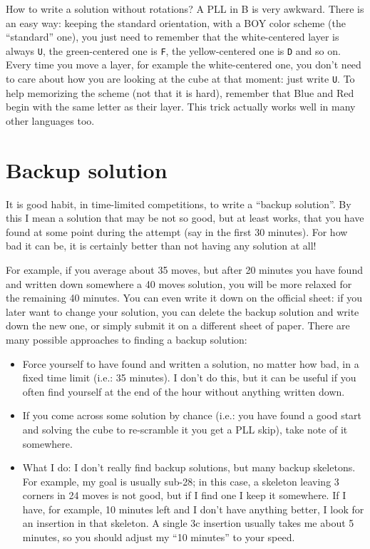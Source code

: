 \documentclass[11pt,a4paper]{book}
\newcommand{\m}{\texttt}
\begin{document}
How to write a solution without rotations? A PLL in B is very awkward. There is an easy way: keeping the standard orientation, with a BOY color scheme (the ``standard'' one), you just need to remember that the white-centered layer is always \m U, the green-centered one is \m F, the yellow-centered one is \m D and so on. Every time you move a layer, for example the white-centered one, you don't need to care about how you are looking at the cube at that moment: just write \m U.
To help memorizing the scheme (not that it is hard), remember that Blue and Red begin with the same letter as their layer. This trick actually works well in many other languages too.

\section{Backup solution}
It is good habit, in time-limited competitions, to write a ``backup solution''. By this I mean a solution that may be not so good, but at least works, that you have found at some point during the attempt (say in the first 30 minutes). For how bad it can be, it is certainly better than not having any solution at all!%

For example, if you average about 35 moves, but after 20 minutes you have found and written down somewhere a 40 moves solution, you will be more relaxed for the remaining 40 minutes. You can even write it down on the official sheet: if you later want to change your solution, you can delete the backup solution and write down the new one, or simply submit it on a different sheet of paper. There are many possible approaches to finding a backup solution:

\begin{itemize}
\item Force yourself to have found and written a solution, no matter how bad, in a fixed time limit (i.e.: 35 minutes). I don't do this, but it can be useful if you often find yourself at the end of the hour without anything written down.
\item If you come across some solution by chance (i.e.: you have found a good start and solving the cube to re-scramble it you get a PLL skip), take note of it somewhere.
\item What I do: I don't really find backup solutions, but many backup skeletons. For example, my goal is usually sub-28; in this case, a skeleton leaving 3 corners in 24 moves is not good, but if I find one I keep it somewhere. If I have, for example, 10 minutes left and I don't have anything better, I look for an insertion in that skeleton. A single 3c insertion usually takes me about 5 minutes, so you should adjust my ``10 minutes'' to your speed.
\end{itemize}
\end{document}
